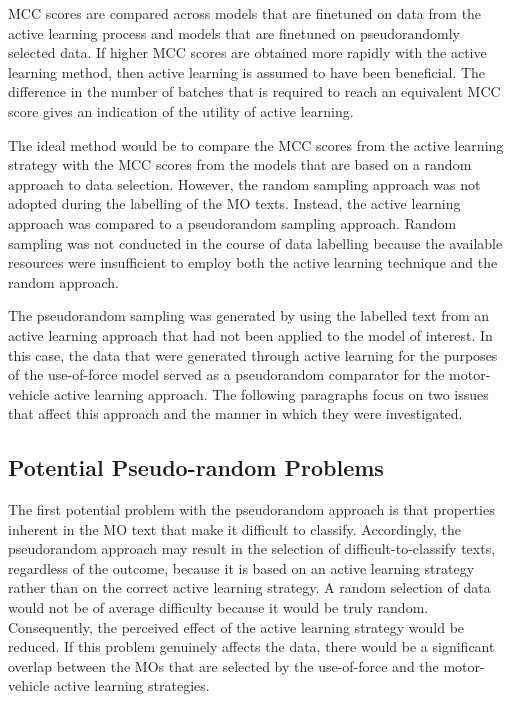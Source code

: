 MCC scores are compared across models that are finetuned on data from the active learning process and models that are finetuned on pseudorandomly selected data. If higher MCC scores are obtained more rapidly with the active learning method, then active learning is assumed to have been beneficial. The difference in the number of batches that is required to reach an equivalent MCC score gives an indication of the utility of active learning.

The ideal method would be to compare the MCC scores from the active learning strategy with the MCC scores from the models that are based on a random approach to data selection. However, the random sampling approach was not adopted during the labelling of the MO texts. Instead, the active learning approach was compared to a pseudorandom sampling approach. Random sampling was not conducted in the course of data labelling because the available resources were insufficient to employ both the active learning technique and the random approach.

The pseudorandom sampling was generated by using the labelled text from an active learning approach that had not been applied to the model of interest. In this case, the data that were generated through active learning for the purposes of the use-of-force model served as a pseudorandom comparator for the motor-vehicle active learning approach. The following paragraphs focus on two issues that affect this approach and the manner in which they were investigated. 

\subsection{Potential Pseudo-random Problems}
The first potential problem with the pseudorandom approach is that properties inherent in the MO text that make it difficult to classify.  Accordingly, the pseudorandom approach may result in the selection of difficult-to-classify texts, regardless of the outcome, because it is based on an active learning strategy rather than on the correct active learning strategy. A random selection of data would not be of average difficulty because it would be truly random. Consequently, the perceived effect of the active learning strategy would be reduced. If this problem genuinely affects the data, there would be a significant overlap between the MOs that are selected by the use-of-force and the motor-vehicle active learning strategies.

